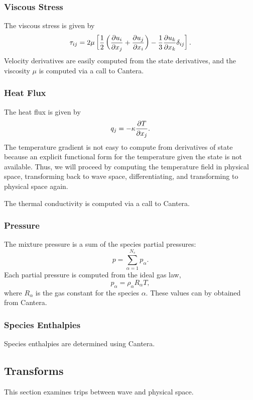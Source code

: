 \subsubsection{Viscous Stress}
The viscous stress is given by
%
\begin{equation*}
\tau_{ij} =  2 \mu \left[ \frac{1}{2} \left(\frac{\partial u_i}{\partial x_j} + \frac{\partial u_j}{\partial x_i} \right) - \frac{1}{3} \frac{\partial u_k}{\partial x_k} \delta_{ij} \right].
\end{equation*}
% 
Velocity derivatives are easily computed from the state derivatives,
and the viscosity $\mu$ is computed via a call to Cantera.

\subsubsection{Heat Flux}
The heat flux is given by
%
\begin{equation*}
q_j = - \kappa \frac{\partial T}{\partial x_j}.
\end{equation*}
% 
The temperature gradient is not easy to compute from derivatives of
state because an explicit functional form for the temperature given
the state is not available.  Thus, we will proceed by computing the
temperature field in physical space, transforming back to wave space,
differentiating, and transforming to physical space again.

The thermal conductivity is computed via a call to Cantera.

\subsubsection{Pressure}
The mixture pressure is a sum of the species partial pressures:
%
\begin{equation*}
p = \sum_{\alpha = 1}^{N_s} p_{\alpha}.
\end{equation*}
%
Each partial pressure is computed from the ideal gas law,
%
\begin{equation*}
p_{\alpha} = \rho_{\alpha} R_{\alpha} T,
\end{equation*}
% 
where $R_{\alpha}$ is the gas constant for the species $\alpha$.
These values can by obtained from Cantera.

\subsubsection{Species Enthalpies}
Species enthalpies are determined using Cantera.

\subsection{Transforms}
This section examines trips between wave and physical space.

